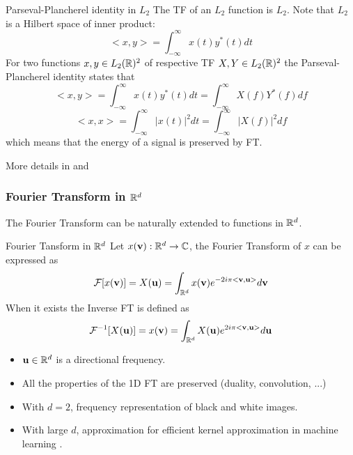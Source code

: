   
  \begin{block}{Parseval-Plancherel identity in $L_2$}
    The TF of an $L_2$ function is $L_2$. Note that  $L_2$ is a Hilbert
      space of inner product:
      $$ <x,y> = \int_{-\infty}^\infty x(t)y^*(t)dt$$
    For two functions $x,y\in L_2(\mathbb{R})^2$ of respective TF $X,Y\in L_2(\mathbb{R})^2$  the
    Parseval-Plancherel identity states that
    \begin{equation}
      <x,y> =  \int_{-\infty}^\infty x(t)y^*(t)dt= \int_{-\infty}^\infty X(f)Y^*(f)df
      \label{eq:parseval}
    \end{equation}
\begin{equation}
    <x,x> = \int_{-\infty}^\infty |x(t)|^2dt= \int_{-\infty}^\infty |X(f)|^2df
        \label{eq:parseval2}
\end{equation}
      which means that the energy of a signal is preserved by FT.
  
  
  \end{block}
  
  More details in \cite[Chap. 5.A]{hunter2019notes} and \cite[Chap. 1]{mallat2015traitement}


  \frametitle{Fourier Transform in $\mathbb{R}^d$}

  The Fourier Transform can be naturally extended to functions in $\mathbb{R}^d$.

  \begin{block}{Fourier Tansform in $\mathbb{R}^d$}
    Let $x(\mathbf{v}): \mathbb{R}^d \rightarrow \mathbb{C}$, the Fourier Transform of $x$ can be expressed as 
    \begin{equation}
      \mathcal{F}[x(\mathbf{v})]= X(\mathbf{u}) = \int_{\mathbb{R}^d} x(\mathbf{v}) e^{-2i\pi <\mathbf{v},\mathbf{u}>} d \mathbf{v} 
      \label{eq:fourier_tranform_rd}
    \end{equation}
    When it exists the Inverse FT is defined as
    \begin{equation}
      \mathcal{F}^{-1}[ X(\mathbf{u})]= x(\mathbf{v}) = \int_{\mathbb{R}^d} X(\mathbf{u}) e^{2i\pi <\mathbf{v},\mathbf{u}>} d \mathbf{u} 
      \label{eq:in_fourier_tranform_rd}
    \end{equation}\vspace{-2mm}
    \begin{itemize}
      \item $\mathbf{u} \in \mathbb{R}^d$ is a directional frequency. 
      \item All the properties of the 1D FT are preserved (duality, convolution, ...)
      \item With $d=2$, frequency representation of black and white images.
      \item With large $d$, approximation for efficient kernel approximation in machine learning \cite{rahimi2008random}.
    \end{itemize}
  \end{block}

